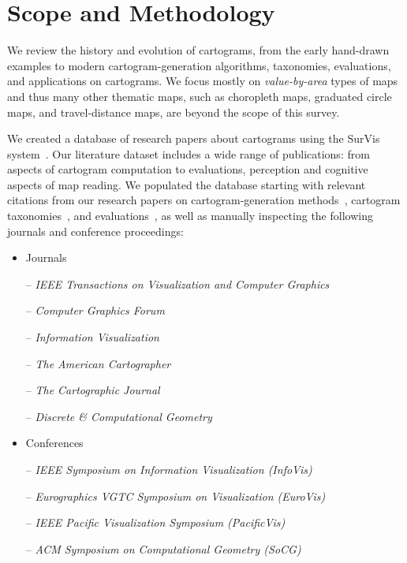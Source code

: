 \documentclass{egpubl}
\begin{document}
\section{Scope and Methodology}






We review the history and evolution of cartograms, from the early
hand-drawn examples to modern cartogram-generation algorithms,
taxonomies, evaluations, and applications on cartograms. We
focus mostly on {\em value-by-area} types of maps and thus many other
thematic maps, such as choropleth maps, graduated circle maps, and travel-distance maps, are beyond the scope of this survey. 

We created a database of research papers about cartograms using the SurVis system~\cite{beck2016visual}. 
Our literature dataset includes a wide range of publications: from aspects of cartogram computation to evaluations, perception and cognitive aspects of map reading. We populated the database starting with relevant citations from our research papers on cartogram-generation methods~\cite{ourSoCG,KKN13}, cartogram taxonomies~\cite{Task_C}, and evaluations~\cite{AKV15}, as well as manually inspecting the following journals and conference proceedings:





\begin{itemize}

\item Journals

-- \textit{IEEE Transactions on Visualization and Computer Graphics}

-- \textit{Computer Graphics Forum}

-- \textit{Information Visualization}

-- \textit{The American Cartographer}

-- \textit{The Cartographic Journal}



-- \textit{Discrete \& Computational Geometry}

\item Conferences

-- \textit{IEEE Symposium on Information Visualization (InfoVis)}

-- \textit{Eurographics VGTC Symposium on Visualization (EuroVis)}

-- \textit{IEEE Pacific Visualization Symposium (PacificVis)}

-- \textit{ACM Symposium on Computational Geometry (SoCG)}











\end{itemize}
\end{document}
